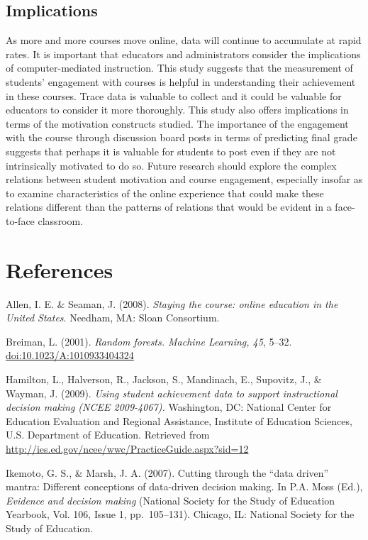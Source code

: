 \documentclass[acmart]{apa6}
\theoremstyle{definition}
\theoremstyle{definition}
\theoremstyle{definition}
\theoremstyle{remark}
\begin{document}
\subsection{Implications}\label{implications}

As more and more courses move online, data will continue to accumulate
at rapid rates. It is important that educators and administrators
consider the implications of computer-mediated instruction. This study
suggests that the measurement of students' engagement with courses is
helpful in understanding their achievement in these courses. Trace data
is valuable to collect and it could be valuable for educators to
consider it more thoroughly. This study also offers implications in
terms of the motivation constructs studied. The importance of the
engagement with the course through discussion board posts in terms of
predicting final grade suggests that perhaps it is valuable for students
to post even if they are not intrinsically motivated to do so. Future
research should explore the complex relations between student motivation
and course engagement, especially insofar as to examine characteristics
of the online experience that could make these relations different than
the patterns of relations that would be evident in a face-to-face
classroom.

\section{References}\label{references}

\begingroup
\setlength{\parindent}{-0.5in} \setlength{\leftskip}{0.5in}

Allen, I. E. \& Seaman, J. (2008). \emph{Staying the course: online
education in the United States}. Needham, MA: Sloan Consortium.

Breiman, L. (2001). \emph{Random forests. Machine Learning, 45}, 5--32.
\url{doi:10.1023/A:1010933404324}

Hamilton, L., Halverson, R., Jackson, S., Mandinach, E., Supovitz, J.,
\& Wayman, J. (2009). \emph{Using student achievement data to support
instructional decision making (NCEE 2009-4067).} Washington, DC:
National Center for Education Evaluation and Regional Assistance,
Institute of Education Sciences, U.S. Department of Education. Retrieved
from \url{http://ies.ed.gov/ncee/wwc/PracticeGuide.aspx?sid=12}

Ikemoto, G. S., \& Marsh, J. A. (2007). Cutting through the
\enquote{data driven} mantra: Different conceptions of data-driven
decision making. In P.A. Moss (Ed.), \emph{Evidence and decision making}
(National Society for the Study of Education Yearbook, Vol. 106, Issue
1, pp.~105--131). Chicago, IL: National Society for the Study of
Education.
\end{document}
